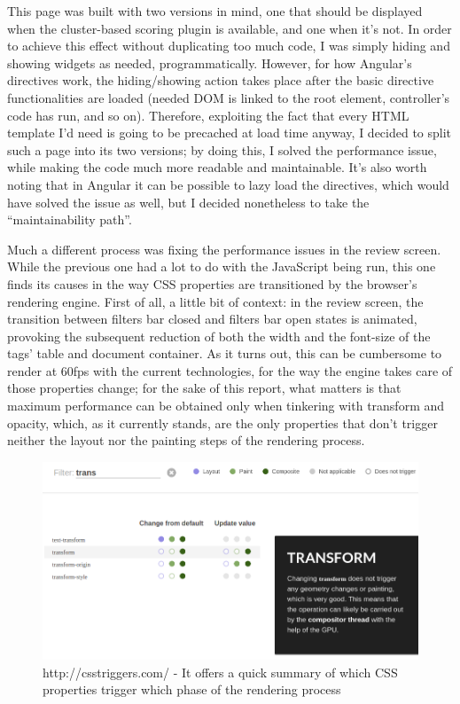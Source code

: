 \documentclass[12pt,svgnames]{memoir}
\begin{document}
This page was built with two versions in mind, one that should be
displayed when the cluster-based scoring plugin is available, and one
when it's not. In order to achieve this effect without duplicating too
much code, I was simply hiding and showing widgets as needed,
programmatically. However, for how Angular's directives work, the
hiding/showing action takes place after the basic directive
functionalities are loaded (needed DOM is linked to the root element,
controller's code has run, and so on). Therefore, exploiting the fact
that every HTML template I'd need is going to be precached at load time
anyway, I decided to split such a page into its two versions; by doing
this, I solved the performance issue, while making the code much more
readable and maintainable. It's also worth noting that in Angular it can
be possible to lazy load the directives, which would have solved the
issue as well, but I decided nonetheless to take the ``maintainability
path''.

Much a different process was fixing the performance issues in the review
screen. While the previous one had a lot to do with the JavaScript being
run, this one finds its causes in the way CSS properties are
transitioned by the browser's rendering engine. First of all, a little
bit of context: in the review screen, the transition between filters bar
closed and filters bar open states is animated, provoking the subsequent
reduction of both the width and the font-size of the tags' table and
document container. As it turns out, this can be cumbersome to render at
60fps with the current technologies, for the way the engine takes care
of those properties change; for the sake of this report, what matters is
that maximum performance can be obtained only when tinkering with
transform and opacity, which, as it currently stands, are the only
properties that don't trigger neither the layout nor the painting steps
of the rendering process.

\begin{figure}[htbp]
\centering
\includegraphics{./src/img/csstriggers.png}
\caption{http://csstriggers.com/ - It offers a quick summary of which
CSS properties trigger which phase of the rendering process}
\end{figure}
\end{document}

